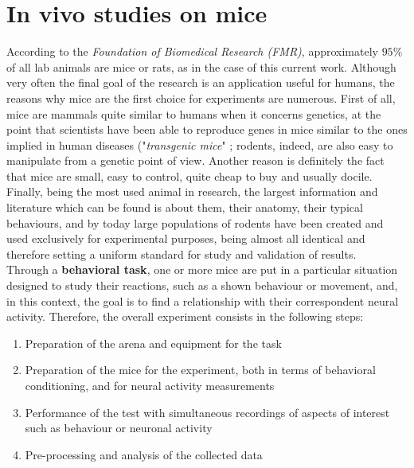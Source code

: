 \documentclass[12pt, a4paper]{report}
\begin{document}
\newpage

\section{In vivo studies on mice}

According to the \textit{Foundation of Biomedical Research (FMR)}, approximately $95\% $ of all lab animals are mice or rats, as in the case of this current work. Although very often the final goal of the research is an application useful for humans, the reasons why mice are the first choice for experiments are numerous. First of all, mice are mammals quite similar to humans when it concerns genetics, at the point that scientists have been able to reproduce genes in mice similar to the ones implied in human diseases ("\textit{transgenic mice}" \cite{7)}; %
 rodents, indeed, are also easy to manipulate from a genetic point of view. Another reason is definitely the fact that mice are small, easy to control, quite cheap to buy and usually docile. Finally, being the most used animal in research, the largest information and literature which can be found is about them, their anatomy, their typical behaviours, and by today large populations of rodents have been created and used exclusively for experimental purposes, being almost all identical and therefore setting a uniform standard for study and validation of results. \\
Through a  \textbf{behavioral task}, one or more mice are put in a particular situation designed to study their reactions, such as a shown behaviour or movement, and, in this context, the goal is to find a relationship with their correspondent neural activity. Therefore, the overall experiment consists in the following steps:
\begin{enumerate}
	\item Preparation of the arena and equipment for the task 
	\item Preparation of the mice for the experiment, both in terms of behavioral conditioning, and for neural activity measurements
	\item Performance of the test with simultaneous recordings of  aspects of interest such as behaviour or neuronal activity
	\item Pre-processing and analysis of the collected data
\end{enumerate}
\end{document}
